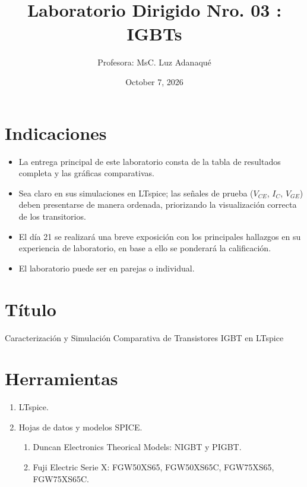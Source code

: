 \documentclass[12pt,a4paper]{article}
\title{%
  \imagen[0.5\linewidth]{logo_unmsm.png}\\
  Laboratorio Dirigido Nro. 03 : IGBTs}
\author{Profesora: MsC. Luz Adanaqué}
\date{October 7, 2026}
\begin{document}
\maketitle

\section{Indicaciones}
\begin{itemize}
  \item La entrega principal de este laboratorio consta de la tabla de
        resultados completa y las gráficas comparativas.
  \item Sea claro en sus simulaciones en LTspice; las señales de prueba
        ($V_{CE}$, $I_C$, $V_{GE}$) deben presentarse de manera ordenada,
        priorizando la visualización correcta de los transitorios.
  \item El día 21 se realizará una breve exposición con los principales
        hallazgos en su experiencia de laboratorio, en base a ello se
        ponderará la calificación.
  \item El laboratorio puede ser en parejas o individual.
\end{itemize}

\section{Título}
Caracterización y Simulación Comparativa de Transistores IGBT en LTspice

\section{Herramientas}
\begin{enumerate}
  \item LTspice.
  \item Hojas de datos y modelos SPICE.
  \begin{enumerate}[label=(\alph*)]
    \item Duncan Electronics Theorical Models: NIGBT y PIGBT.
    \item Fuji Electric Serie X: FGW50XS65, FGW50XS65C, FGW75XS65,
          FGW75XS65C.
  \end{enumerate}
\end{enumerate}
\end{document}
